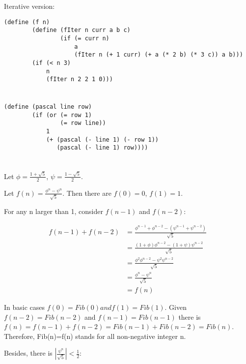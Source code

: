 \documentclass[a4paper]{report}
\begin{document}
Iterative version:

\begin{lstlisting}
(define (f n)
        (define (fIter n curr a b c)
                (if (= curr n)
                    a
                    (fIter n (+ 1 curr) (+ a (* 2 b) (* 3 c)) a b)))
        (if (< n 3)
            n
            (fIter n 2 2 1 0)))
\end{lstlisting}


\section{}

\begin{lstlisting}
(define (pascal line row)
        (if (or (= row 1)
                (= row line))
            1
            (+ (pascal (- line 1) (- row 1))
               (pascal (- line 1) row))))
\end{lstlisting}


\section{}

Let $\phi = \frac{1 + \sqrt{5}}{2}$, $\psi = \frac{1 - \sqrt{5}}{2}$.

Let $f(n) = \frac{\phi ^ n - \psi ^ n}{\sqrt{5}}$. Then there are $f(0) = 0$, $f(1) = 1$.

For any n larger than 1, consider $f(n - 1)$ and $f(n - 2)$:

\begin{align*}
f(n-1) + f(n-2) &= \frac{\phi^{n-1} + \phi^{n-2}-(\psi^{n-1}+\psi^{n-2})}{\sqrt{5}} \\
                &= \frac{(1+\phi)\phi^{n-2}-(1+\psi)\psi^{n-2}}{\sqrt{5}} \\
                &= \frac{\phi^2\phi^{n-2}-\psi^2\psi^{n-2}}{\sqrt{5}} \\
                &= \frac{\phi^n-\psi^n}{\sqrt{5}} \\
                &= f(n)
\end{align*}

In basic cases $f(0)=Fib(0) and f(1)=Fib(1)$. Given $f(n-2)=Fib(n-2)$ and
 $f(n-1)=Fib(n-1)$ there is
 $f(n)=f(n-1)+f(n-2)=Fib(n-1)+Fib(n-2)=Fib(n)$. Therefore, Fib(n)=f(n)
 stands for all non-negative integer n.

Besides, there is $|\frac{\psi^n}{\sqrt{5}}|<\frac{1}{2}$:
\end{document}
